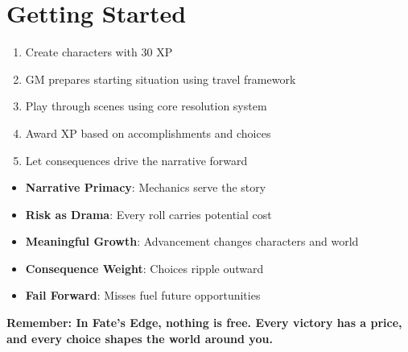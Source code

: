 \documentclass[11pt]{article}
\begin{document}
\section{Getting Started}

\begin{enumerate}
    \item Create characters with 30 XP
    \item GM prepares starting situation using travel framework
    \item Play through scenes using core resolution system
    \item Award XP based on accomplishments and choices
    \item Let consequences drive the narrative forward
\end{enumerate}

\begin{fatebox}
\begin{itemize}
    \item \textbf{Narrative Primacy}: Mechanics serve the story
    \item \textbf{Risk as Drama}: Every roll carries potential cost
    \item \textbf{Meaningful Growth}: Advancement changes characters and world
    \item \textbf{Consequence Weight}: Choices ripple outward
    \item \textbf{Fail Forward}: Misses fuel future opportunities
\end{itemize}
\end{fatebox}

\begin{center}
\textbf{Remember: In Fate's Edge, nothing is free. Every victory has a price,}\\
\textbf{and every choice shapes the world around you.}
\end{center}
\end{document}
